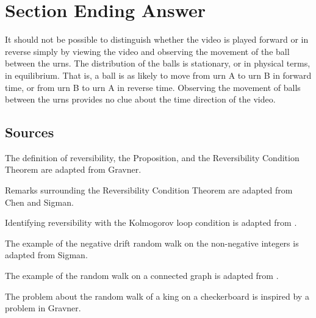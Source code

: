 \documentclass[12pt]{article}
\begin{document}
\section*{Section Ending Answer}

It should not be possible to distinguish whether the video is played
forward or in reverse simply by viewing the video and observing the
movement of the ball between the urns.  The distribution of the balls is
stationary, or in physical terms, in equilibrium.  That is, a ball is as
likely to move from urn A to urn B in forward time, or from urn B to urn
A in reverse time. Observing the movement of balls between the urns
provides no clue about the time direction of the video.

\subsection*{Sources}

The definition of reversibility, the Proposition, and the Reversibility
Condition Theorem are adapted from 
{Gravner}.

Remarks surrounding the Reversibility Condition Theorem are adapted from
{Chen} and 
{Sigman}.

Identifying reversibility with the Kolmogorov loop condition is adapted
from 
\cite{brill18}.

The example of the negative drift random walk on the non-negative
integers is adapted from 
{Sigman}.

The example of the random walk on a connected graph is adapted from
.

The problem about the random walk of a king on a checkerboard is
inspired by a problem in 
{Gravner}.

\nocite{}
\nocite{}

\hr

\end{document}
